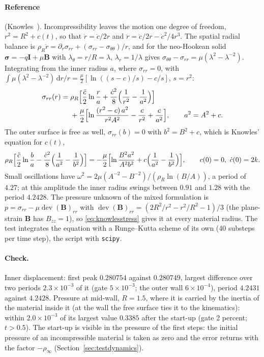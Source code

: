 \documentclass[11pt]{article}
\newcommand{\ud}{\,\mathrm{d}}
\newcommand{\dev}{\operatorname{dev}}
\newcommand{\bsig}{\bm{\sigma}}
\newcommand{\bB}{\bm{B}}
\newcommand{\bI}{\bm{I}}
\DeclareRobustCommand{\code}[1]{{\def\_{\textunderscore\allowbreak}\texttt{#1}}}
\begin{document}
\paragraph{Reference} (Knowles~\cite{knowles}).  Incompressibility leaves
the motion one degree of freedom, $r^2 = R^2 + c(t)$, so that
$\dot r = \dot c/2r$ and $\ddot r = \ddot c/2r - \dot c^2/4r^3$.  The
spatial radial balance is
$\rho_R\ddot r = \partial_r\sigma_{rr} + (\sigma_{rr} - \sigma_{\theta\theta})/r$,
and for the neo-Hookean solid $\bsig = -q\bI + \mu\bB$ with
$\lambda_\theta = r/R = \lambda$, $\lambda_r = 1/\lambda$ gives
$\sigma_{\theta\theta} - \sigma_{rr} = \mu(\lambda^2 - \lambda^{-2})$.
Integrating from the inner radius $a$, where $\sigma_{rr} = 0$, with
$\int\mu(\lambda^2 - \lambda^{-2})\ud r/r = \tfrac{\mu}{2}[\ln((s - c)/s) -
c/s]$, $s = r^2$:
\begin{equation}
\begin{aligned}
  \sigma_{rr}(r) ={}& \rho_R\Bigl[\frac{\ddot c}{2}\ln\frac ra
  + \frac{\dot c^2}{8}\Bigl(\frac1{r^2} - \frac1{a^2}\Bigr)\Bigr] \\
  &+ \frac\mu2\Bigl[\ln\frac{(r^2 - c)\,a^2}{r^2A^2} - \frac c{r^2} + \frac c{a^2}\Bigr],
  \qquad a^2 = A^2 + c .
\end{aligned}
\label{eq:knowlesstress}
\end{equation}
The outer surface is free as well, $\sigma_{rr}(b) = 0$ with
$b^2 = B^2 + c$, which is Knowles' equation for $c(t)$,
\begin{equation}
  \rho_R\Bigl[\frac{\ddot c}{2}\ln\frac ba
  - \frac{\dot c^2}{8}\Bigl(\frac1{a^2} - \frac1{b^2}\Bigr)\Bigr]
  = -\frac\mu2\Bigl[\ln\frac{B^2a^2}{A^2b^2} + c\Bigl(\frac1{a^2} - \frac1{b^2}\Bigr)\Bigr],
  \qquad c(0) = 0,\ \dot c(0) = 2k .
\end{equation}
Small oscillations have $\omega^2 = 2\mu(A^{-2} - B^{-2})/(\rho_R\ln(B/A))$,
a period of $4.27$; at this amplitude the inner radius swings between $0.91$
and $1.28$ with the period $4.2428$.  The pressure unknown of the mixed
formulation is $p = \sigma_{rr} - \mu\dev(\bB)_{rr}$ with
$\dev(\bB)_{rr} = (2R^2/r^2 - r^2/R^2 - 1)/3$ (the plane-strain $\bB$ has
$B_{zz} = 1$), so \eqref{eq:knowlesstress} gives it at every material
radius.  The test integrates the equation with a Runge--Kutta scheme of its
own (40 substeps per time step), the script with \code{scipy}.

\paragraph{Check.}  Inner displacement: first peak $0.280754$ against
$0.280749$, largest difference over two periods $2.3\times10^{-3}$ of it
(gate $5\times10^{-3}$; the outer wall $6\times10^{-4}$), period $4.2431$
against $4.2428$.  Pressure at mid-wall, $R = 1.5$, where it is carried by
the inertia of the material inside it (at the wall the free surface ties it
to the kinematics): within $2.0\times10^{-3}$ of its largest value $0.3385$
after the start-up (gate 2 percent; $t > 0.5$).  The start-up is visible in
the pressure of the first steps: the initial pressure of an incompressible
material is taken as zero and the error returns with the factor
$-\rho_\infty$ (Section~\ref{sec:testdynamics}).
\end{document}
